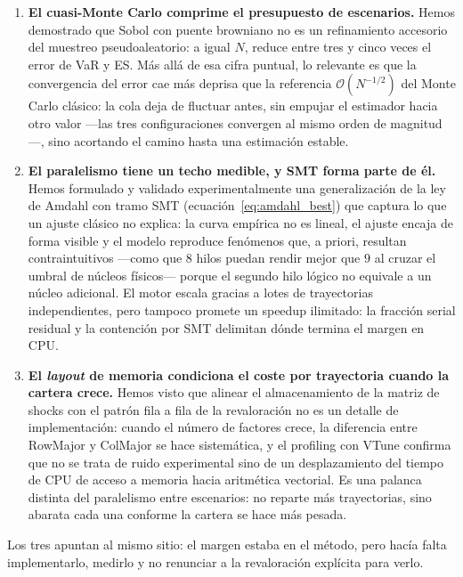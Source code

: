\documentclass[11pt]{article}
\begin{document}
\begin{enumerate}
    \item \textbf{El cuasi-Monte Carlo comprime el presupuesto de escenarios.}
    Hemos demostrado que Sobol con puente browniano no es un refinamiento accesorio del muestreo pseudoaleatorio: a igual $N$, reduce entre tres y cinco veces el error de VaR y ES.
    Más allá de esa cifra puntual, lo relevante es que la convergencia del error cae más deprisa que la referencia $\mathcal{O}(N^{-1/2})$ del Monte Carlo clásico: la cola deja de fluctuar antes, sin empujar el estimador hacia otro valor ---las tres configuraciones convergen al mismo orden de magnitud---, sino acortando el camino hasta una estimación estable.

    \item \textbf{El paralelismo tiene un techo medible, y SMT forma parte de él.}
    Hemos formulado y validado experimentalmente una generalización de la ley de Amdahl con tramo SMT (ecuación~\ref{eq:amdahl_best}) que captura lo que un ajuste clásico no explica: la curva empírica no es lineal, el ajuste encaja de forma visible y el modelo reproduce fenómenos que, a priori, resultan contraintuitivos ---como que $8$ hilos puedan rendir mejor que $9$ al cruzar el umbral de núcleos físicos--- porque el segundo hilo lógico no equivale a un núcleo adicional.
    El motor escala gracias a lotes de trayectorias independientes, pero tampoco promete un speedup ilimitado: la fracción serial residual y la contención por SMT delimitan dónde termina el margen en CPU.

    \item \textbf{El \emph{layout} de memoria condiciona el coste por trayectoria cuando la cartera crece.}
    Hemos visto que alinear el almacenamiento de la matriz de shocks con el patrón fila a fila de la revaloración no es un detalle de implementación: cuando el número de factores crece, la diferencia entre RowMajor y ColMajor se hace sistemática, y el profiling con VTune confirma que no se trata de ruido experimental sino de un desplazamiento del tiempo de CPU de acceso a memoria hacia aritmética vectorial.
    Es una palanca distinta del paralelismo entre escenarios: no reparte más trayectorias, sino abarata cada una conforme la cartera se hace más pesada.
\end{enumerate}

Los tres apuntan al mismo sitio: el margen estaba en el método, pero hacía falta implementarlo, medirlo y no renunciar a la revaloración explícita para verlo.
\end{document}
